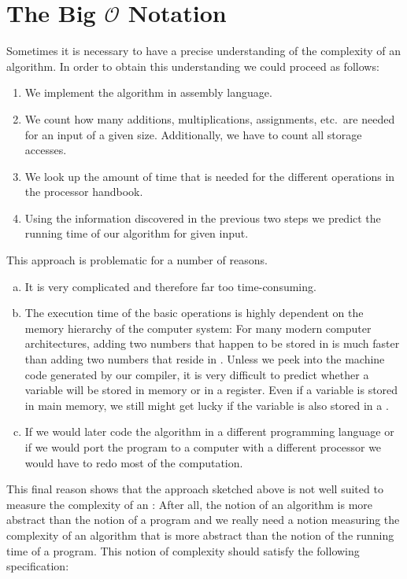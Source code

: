 \section{The Big $\mathcal{O}$ Notation}
Sometimes it is necessary to have a precise understanding of the complexity of an algorithm.  
In order to obtain this understanding we could proceed as follows:  
\begin{enumerate}
\item We implement the algorithm in assembly language.
\item We count how many additions, multiplications, assignments, etc.~are needed
      for an input of a given size.  Additionally, we have to count all storage accesses.
\item We look up the amount of time that is needed for the different operations in the processor handbook.
\item Using the information discovered in the previous two steps we predict the running
      time of our algorithm for given input.
\end{enumerate}
This approach is problematic for a number of reasons.
\begin{enumerate}[(a)]
\item It is very complicated and therefore far too time-consuming.
\item The execution time of the basic operations is highly dependent on the memory hierarchy of the
      computer system:  For many modern computer architectures, adding two numbers that happen to be
      stored in  is much faster than adding two numbers that reside in
      .  Unless we peek into the machine code generated by our compiler, it is very difficult
      to predict whether a variable will be stored in memory or in a register.  Even if a variable
      is stored in main memory, we still might get lucky if the variable is also stored in a .
\item If we would later code the algorithm in a different programming language or if we would port
      the program to a computer with a different processor we would have to redo most of the
      computation. 
\end{enumerate}
This final reason shows that the approach sketched above is not well suited to measure the complexity of
an : After all, the notion of an algorithm is more abstract than the notion of a program
and we really need a notion measuring the complexity of an algorithm that is more abstract than the
notion of the running time of a program.  This notion of complexity should satisfy the following
specification:

